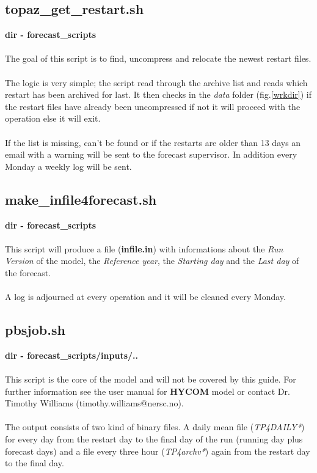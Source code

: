 \documentclass[12pt,a4paper]{report}
\begin{document}
\subsection{topaz\_get\_restart.sh}
\label{topazgetrestart}
\textbf{dir - forecast\_scripts}
\\ \\
The goal of this script is to find, uncompress and relocate the newest restart files.
\\ \\
The logic is very simple; the script read through the archive list and reads which restart has been archived for last. It then checks in the \textit{data} folder (fig.\ref{wrkdir}) if the restart files have already been uncompressed if not it will proceed with the operation else it will exit.
\\ \\
If the list is missing, can't be found or if the restarts are older than 13 days an email with a warning will be sent to the forecast supervisor. In addition every Monday a weekly log will be sent.

\subsection{make\_infile4forecast.sh}
\label{makeinfile4forecast}
\textbf{dir - forecast\_scripts}
\\ \\
This script will produce a file (\textbf{infile.in}) with informations about the \textit{Run Version} of the model, the \textit{Reference year}, the \textit{Starting day} and the \textit{Last day} of the forecast.
\\ \\
A log is adjourned at every operation and it will be cleaned every Monday.

\subsection{pbsjob.sh}
\label{pbsjob}
\textbf{dir - forecast\_scripts/inputs/..}
\\ \\
This script is the core of the model and will not be covered by this guide. For further information see the user manual for \textbf{HYCOM} model or contact Dr. Timothy Williams (timothy.williams@nersc.no).
\\ \\
The output consists of two kind of binary files. A daily mean file (\textit{TP4DAILY*}) for every day from the restart day to the final day of the run (running day plus forecast days) and a file every three hour (\textit{TP4archv*}) again from the restart day to the final day.
\end{document}
